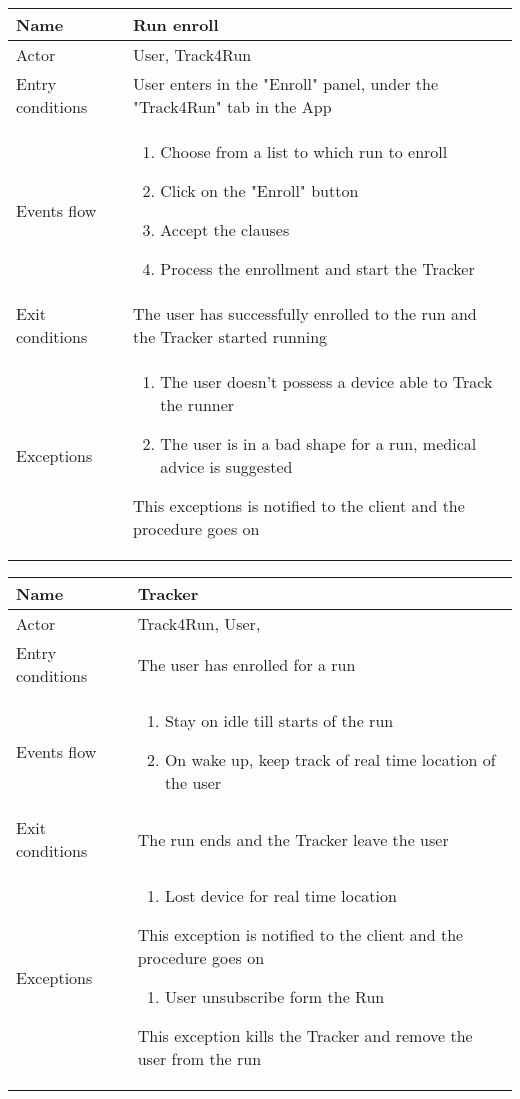 \begin{table}[]
\begin{tabular}{|l|p{12cm}|}
\hline
Name             & Run enroll \\ \hline
Actor            & User, Track4Run \\ \hline
Entry conditions & User enters in the "Enroll" panel, under the "Track4Run" tab in the App  \\ \hline
Events flow      & \begin{enumerate}
\item Choose from a list to which run to enroll
\item Click on the "Enroll" button
\item Accept the clauses
\item Process the enrollment and start the Tracker
\end{enumerate} \\ \hline
Exit conditions  & The user has successfully enrolled to the run and the Tracker started running \\ \hline
Exceptions       & \begin{enumerate}
\item The user doesn't possess a device able to Track the runner
\item The user is in a bad shape for a run, medical advice is suggested
\end{enumerate} This exceptions is notified to the client and the procedure goes on\\ \hline
\end{tabular}
\end{table}

\begin{table}[]
\begin{tabular}{|l|p{12cm}|}
\hline
Name             & Tracker \\ \hline
Actor            & Track4Run, User,  \\ \hline
Entry conditions & The user has enrolled for a run \\ \hline
Events flow      & \begin{enumerate}
\item Stay on idle till starts of the run
\item On wake up, keep track of real time location of the user
\end{enumerate} \\ \hline
Exit conditions  & The run ends and the Tracker leave the user \\ \hline
Exceptions       & \begin{enumerate}
\item Lost device for real time location
\end{enumerate} This exception is notified to the client and the procedure goes on
\begin{enumerate}
\item User unsubscribe form the Run
\end{enumerate} This exception kills the Tracker and remove the user from the run\\ \hline
\end{tabular}
\end{table}

